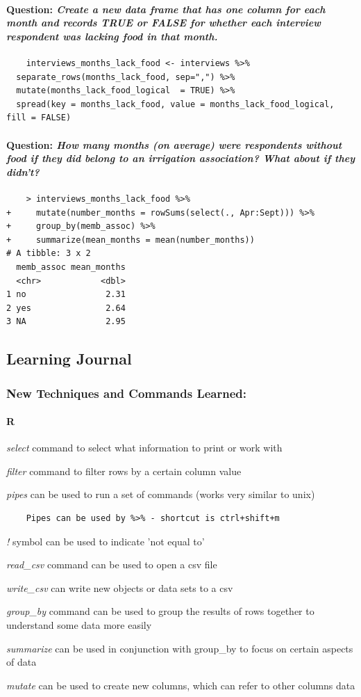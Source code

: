 \documentclass[12pt]{article}
\newcommand{\learning}[2]{\item \textit{#1} \textnormal{#2}}
\newcommand{\question}[1]{\paragraph{Question: {\textnormal{\textit{#1}}} ~\\}}
\begin{document}
\question{Create a new data frame that has one column for each month and records TRUE or FALSE for whether each interview respondent was lacking food in that month.}
\begin{verbatim}
    interviews_months_lack_food <- interviews %>%
  separate_rows(months_lack_food, sep=",") %>%
  mutate(months_lack_food_logical  = TRUE) %>%
  spread(key = months_lack_food, value = months_lack_food_logical, fill = FALSE)
\end{verbatim}

\question{How many months (on average) were respondents without food if they did belong to an irrigation association? What about if they didn’t?}
\begin{verbatim}
    > interviews_months_lack_food %>%
+     mutate(number_months = rowSums(select(., Apr:Sept))) %>%
+     group_by(memb_assoc) %>%
+     summarize(mean_months = mean(number_months))
# A tibble: 3 x 2
  memb_assoc mean_months
  <chr>            <dbl>
1 no                2.31
2 yes               2.64
3 NA                2.95
\end{verbatim}
\newpage
\subsection{Learning Journal}

\subsubsection{New Techniques and Commands Learned:}

\paragraph{R}

\learning{select}{command to select what information to print or work with}
\learning{filter}{command to filter rows by a certain column value}
\learning{pipes}{can be used to run a set of commands (works very similar to unix)}
\begin{verbatim}
    Pipes can be used by %>% - shortcut is ctrl+shift+m
\end{verbatim}
\learning{!}{symbol can be used to indicate 'not equal to'}
\learning{read\_csv}{command can be used to open a csv file}
\learning{write\_csv}{can write new objects or data sets to a csv}
\learning{group\_by}{command can be used to group the results of rows together to understand some data more easily}
\learning{summarize}{can be used in conjunction with group\_by to focus on certain aspects of data}
\learning{mutate}{can be used to create new columns, which can refer to other columns data}
\end{document}
